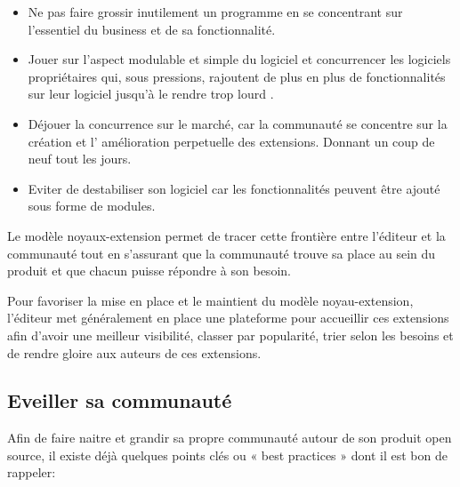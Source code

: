			\begin{itemize}[label=\textbullet, font=\LARGE \color{burntorange}]
			\item Ne pas faire grossir inutilement un programme en se concentrant sur l'essentiel du business et de sa fonctionnalité.
			\item Jouer sur l'aspect modulable et simple du logiciel et concurrencer les logiciels propriétaires qui, sous pressions, rajoutent de plus en plus de fonctionnalités sur leur logiciel jusqu'à le rendre trop lourd .
			\item Déjouer la concurrence sur le marché, car la communauté se concentre sur la création et l' amélioration perpetuelle des extensions. Donnant un coup de neuf tout les jours.
			\item Eviter de destabiliser son logiciel car les fonctionnalités peuvent être ajouté sous forme de modules.
			\end{itemize}

			Le modèle noyaux-extension permet de tracer cette frontière entre l'éditeur et la communauté tout en s'assurant que la communauté trouve sa place au sein du produit et que chacun puisse répondre à son besoin.

			Pour favoriser la mise en place et le maintient du modèle noyau-extension, l'éditeur met généralement en place une plateforme pour accueillir ces extensions afin d'avoir une meilleur visibilité, classer par popularité, trier selon les besoins et de rendre gloire aux auteurs de ces extensions.
			
		\subsection{Eveiller sa communauté}

			Afin de faire naitre et grandir sa propre communauté autour de son produit open source, il existe déjà quelques points clés ou « best practices » dont il est bon de rappeler:

